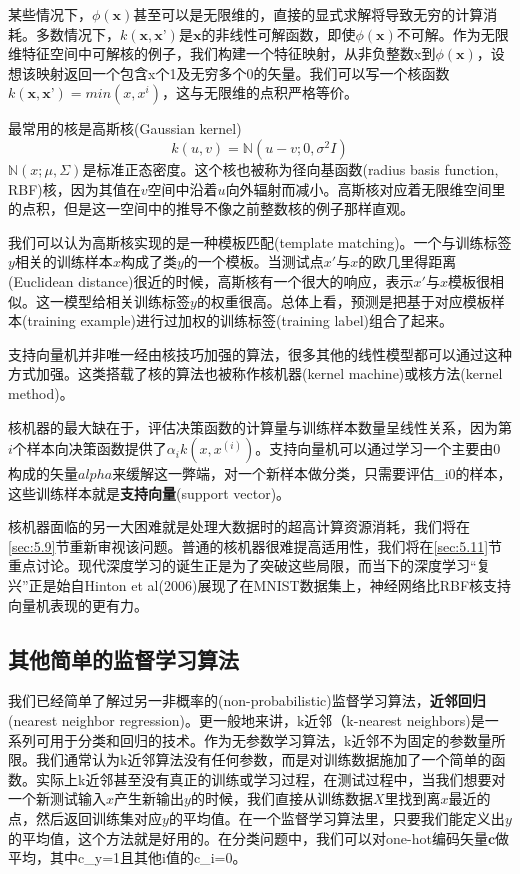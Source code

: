 某些情况下，$\phi(\textbf{x})$甚至可以是无限维的，直接的显式求解将导致无穷的计算消耗。多数情况下，$k(\textbf{x}, \textbf{x'})$是$\textbf{x}$的非线性可解函数，即使$\phi(\textbf{x})$不可解。作为无限维特征空间中可解核的例子，我们构建一个特征映射，从非负整数x到$\phi(\textbf{x})$，设想该映射返回一个包含x个1及无穷多个0的矢量。我们可以写一个核函数$k(\textbf{x}, \textbf{x'}) = min(x, x^{i})$，这与无限维的点积严格等价。

最常用的核是高斯核(Gaussian kernel)
\begin{equation}
	k(u, v) = \mathbb{N}(u-v;0, \sigma^{2}I)
\end{equation}
$\mathbb{N}(x;\mu,\Sigma)$是标准正态密度。这个核也被称为径向基函数(radius basis function, RBF)核，因为其值在$v$空间中沿着$u$向外辐射而减小。高斯核对应着无限维空间里的点积，但是这一空间中的推导不像之前整数核的例子那样直观。

我们可以认为高斯核实现的是一种模板匹配(template matching)。一个与训练标签$y$相关的训练样本$x$构成了类$y$的一个模板。当测试点$x'$与$x$的欧几里得距离(Euclidean distance)很近的时候，高斯核有一个很大的响应，表示$x'$与$x$模板很相似。这一模型给相关训练标签$y$的权重很高。总体上看，预测是把基于对应模板样本(training example)进行过加权的训练标签(training label)组合了起来。

支持向量机并非唯一经由核技巧加强的算法，很多其他的线性模型都可以通过这种方式加强。这类搭载了核的算法也被称作核机器(kernel machine)或核方法(kernel method)。

核机器的最大缺在于，评估决策函数的计算量与训练样本数量呈线性关系，因为第$i$个样本向决策函数提供了$\alpha_{i}k(x,x^{(i)})$。支持向量机可以通过学习一个主要由0构成的矢量$alpha$来缓解这一弊端，对一个新样本做分类，只需要评估\alpha_{i}\neq0的样本，这些训练样本就是\textbf{支持向量}(support vector)。

核机器面临的另一大困难就是处理大数据时的超高计算资源消耗，我们将在\ref{sec:5.9}节重新审视该问题。普通的核机器很难提高适用性，我们将在\ref{sec:5.11}节重点讨论。现代深度学习的诞生正是为了突破这些局限，而当下的深度学习“复兴”正是始自Hinton et al(2006)展现了在MNIST数据集上，神经网络比RBF核支持向量机表现的更有力。

\subsection{其他简单的监督学习算法}
\label{sec:5.7.3}

我们已经简单了解过另一非概率的(non-probabilistic)监督学习算法，\textbf{近邻回归}(nearest neighbor regression)。更一般地来讲，k近邻（k-nearest neighbors)是一系列可用于分类和回归的技术。作为无参数学习算法，k近邻不为固定的参数量所限。我们通常认为k近邻算法没有任何参数，而是对训练数据施加了一个简单的函数。实际上k近邻甚至没有真正的训练或学习过程，在测试过程中，当我们想要对一个新测试输入$x$产生新输出$y$的时候，我们直接从训练数据$X$里找到离$x$最近的点，然后返回训练集对应$y$的平均值。在一个监督学习算法里，只要我们能定义出$y$的平均值，这个方法就是好用的。在分类问题中，我们可以对one-hot编码矢量$\textbf{c}$做平均，其中c_{y}=1且其他i值的c_{i}=0。


